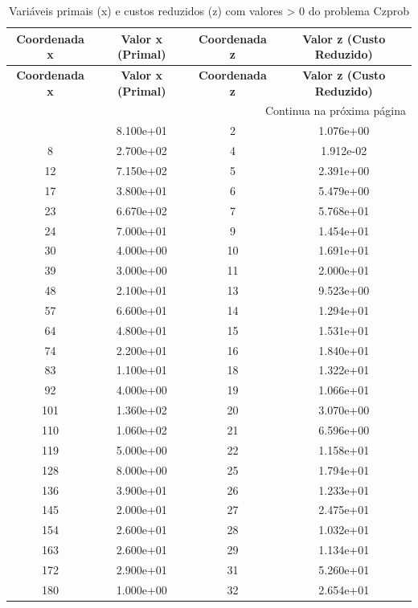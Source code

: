 \documentclass[12pt]{article}
\begin{document}
\begin{longtable}{@{}cccc@{}}
\caption{Variáveis primais (x) e custos reduzidos (z) com valores > 0 do problema Czprob} \\
\toprule
\textbf{Coordenada x} & \textbf{Valor x (Primal)} & \textbf{Coordenada z} & \textbf{Valor z (Custo Reduzido)} \\
\midrule
\endfirsthead

\toprule
\textbf{Coordenada x} & \textbf{Valor x (Primal)} & \textbf{Coordenada z} & \textbf{Valor z (Custo Reduzido)} \\
\midrule
\endhead

\midrule \multicolumn{4}{r}{{Continua na próxima página}} \\ \midrule
\endfoot

\bottomrule
\endlastfoot
3 & 8.100e+01 & 2 & 1.076e+00 \\
8 & 2.700e+02 & 4 & 1.912e-02 \\
12 & 7.150e+02 & 5 & 2.391e+00 \\
17 & 3.800e+01 & 6 & 5.479e+00 \\
23 & 6.670e+02 & 7 & 5.768e+01 \\
24 & 7.000e+01 & 9 & 1.454e+01 \\
30 & 4.000e+00 & 10 & 1.691e+01 \\
39 & 3.000e+00 & 11 & 2.000e+01 \\
48 & 2.100e+01 & 13 & 9.523e+00 \\
57 & 6.600e+01 & 14 & 1.294e+01 \\
64 & 4.800e+01 & 15 & 1.531e+01 \\
74 & 2.200e+01 & 16 & 1.840e+01 \\
83 & 1.100e+01 & 18 & 1.322e+01 \\
92 & 4.000e+00 & 19 & 1.066e+01 \\
101 & 1.360e+02 & 20 & 3.070e+00 \\
110 & 1.060e+02 & 21 & 6.596e+00 \\
119 & 5.000e+00 & 22 & 1.158e+01 \\
128 & 8.000e+00 & 25 & 1.794e+01 \\
136 & 3.900e+01 & 26 & 1.233e+01 \\
145 & 2.000e+01 & 27 & 2.475e+01 \\
154 & 2.600e+01 & 28 & 1.032e+01 \\
163 & 2.600e+01 & 29 & 1.134e+01 \\
172 & 2.900e+01 & 31 & 5.260e+01 \\
180 & 1.000e+00 & 32 & 2.654e+01 \\

\end{longtable}
\end{document}
